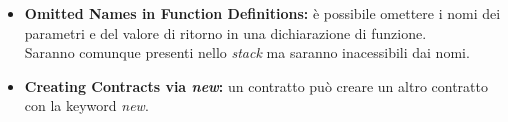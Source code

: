 \documentclass{article}
\begin{document}
\begin{itemize}
                    \item \textbf{Omitted Names in Function Definitions:} è possibile omettere i nomi dei parametri e del valore di ritorno in una dichiarazione di funzione. \\
                    Saranno comunque presenti nello \textit{stack} ma saranno inacessibili dai nomi.

                    \item \textbf{Creating Contracts via \textit{new}:} un contratto può creare un altro contratto con la keyword \textit{new}. 
                    

                \end{itemize}
\end{document}
